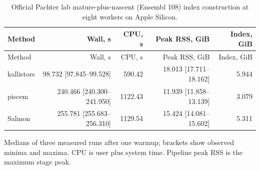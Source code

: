 \begingroup
\small
\setlength{\tabcolsep}{4pt}
\begin{longtable}{@{}lrrrr@{}}
\caption{Official Pachter lab mature-plus-nascent (Ensembl 108) index construction at eight workers on Apple Silicon.}\label{tab:paper-index}\\
\toprule
Method & Wall, s & CPU, s & Peak RSS, GiB & Index, GiB \\
\midrule
\endfirsthead
\toprule
Method & Wall, s & CPU, s & Peak RSS, GiB & Index, GiB \\
\midrule
\endhead
\bottomrule
\endfoot
kallistors & 98.732 [97.845--99.528] & 590.42 & 18.013 [17.711--18.162] & 5.944 \\
piscem & 240.466 [240.300--241.950] & 1122.43 & 11.939 [11.858--13.139] & 3.079 \\
Salmon & 255.781 [255.683--256.310] & 1129.54 & 15.424 [14.081--15.602] & 5.311 \\
\end{longtable}
\noindent\footnotesize Medians of three measured runs after one warmup; brackets show observed minima and maxima. CPU is user plus system time. Pipeline peak RSS is the maximum stage peak.
\endgroup
